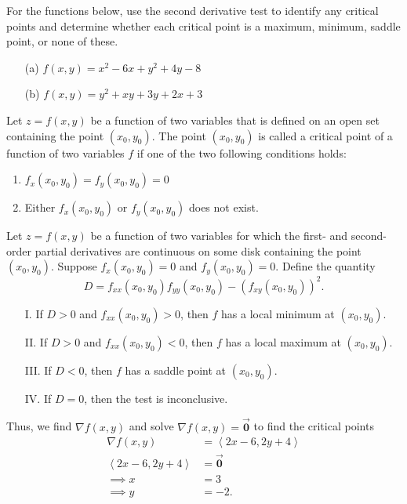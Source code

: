 \documentclass{report}
\begin{document}
    \bigbreak \noindent 
    \begin{mdframed}
        \noindent For the functions below, use the second derivative test to identify any critical points and determine whether each critical point is a maximum, minimum, saddle point, or none of these.
        \begin{enumerate}
            \item[(a)] $f(x, y) = x^2 - 6x + y^2 + 4y - 8$
            \item[(b)] $f(x, y) = y^2 + xy + 3y + 2x + 3$
        \end{enumerate}       
    \end{mdframed}
    \bigbreak \noindent 
    \begin{remark}
        Let $z = f(x, y)$ be a function of two variables that is defined on an open set containing the point $(x_0, y_0)$. The point $(x_0, y_0)$ is called a critical point of a function of two variables $f$ if one of the two following conditions holds:
        \begin{enumerate}
            \item $f_x(x_0, y_0) = f_y(x_0, y_0) = 0$
            \item Either $f_x(x_0, y_0)$ or $f_y(x_0, y_0)$ does not exist.
        \end{enumerate}
        \bigbreak \noindent 
        Let $z = f(x, y)$ be a function of two variables for which the first- and second-order partial derivatives are continuous on some disk containing the point $(x_0, y_0)$. Suppose $f_x(x_0, y_0) = 0$ and $f_y(x_0, y_0) = 0$. Define the quantity
        \[ D = f_{xx}(x_0, y_0)f_{yy}(x_0, y_0) - (f_{xy}(x_0, y_0))^2. \]
        \begin{enumerate}
            \item[I.] If $D > 0$ and $f_{xx}(x_0, y_0) > 0$, then $f$ has a local minimum at $(x_0, y_0)$.
            \item[II.] If $D > 0$ and $f_{xx}(x_0, y_0) < 0$, then $f$ has a local maximum at $(x_0, y_0)$.
            \item[III.] If $D < 0$, then $f$ has a saddle point at $(x_0, y_0)$.
            \item[IV.] If $D = 0$, then the test is inconclusive.
        \end{enumerate}
    \end{remark}
    \bigbreak \noindent 
    Thus, we find $\nabla f(x,y)$ and solve $\nabla f(x,y) = \vec{\mathbf{0}}$ to find the critical points
    \begin{align*}
        \nabla f(x,y) &= \left\langle 2x-6, 2y+4 \right\rangle \\
        \left\langle 2x-6, 2y+4 \right\rangle &= \vec{\mathbf{0}} \\ 
        \implies x&=3 \\
        \implies y&=-2
    .\end{align*}
\end{document}
